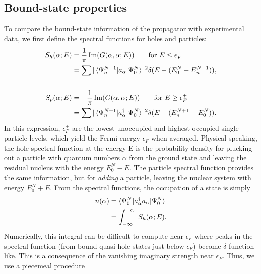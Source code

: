 \subsection{Bound-state properties}
To compare the bound-state information of the propagator with experimental data, we first
define the spectral functions for holes and particles:
\begin{equation}
    \begin{split}
        S_{h}(\alpha; E) & =
        \frac{1}{\pi}\operatorname{Im}({G(\alpha,\alpha;E)})\qquad \text{for } E\leq\epsilon_{F}^{-}\\
        & = \sum|\braket{\Psi^{N-1}_{n}|a_{\alpha}|\Psi^{N}_{0}}|^{2}
        \delta(E-(E^{N}_{0}-E_{n}^{N-1})),\\
        \\
        S_{p}(\alpha; E) & =
        -\frac{1}{\pi}\operatorname{Im}({G(\alpha,\alpha;E)})\qquad \text{for } E\geq\epsilon_{F}^{+}\\
        & = \sum|\braket{\Psi^{N+1}_{n}|a_{\alpha}^{\dagger}|\Psi^{N}_{0}}|^{2}
        \delta(E-(E_{n}^{N+1}-E^{N}_{0})).
    \end{split}
\end{equation}
In this expression, $\epsilon_{F}^{\pm}$ are the lowest-unoccupied and highest-occupied
single-particle levels, which yield the Fermi energy $\epsilon_{F}$ when averaged. Physical
speaking, the hole spectral function at the energy E is the probability density for plucking out
a particle with quantum numbers $\alpha$ from the ground state and leaving the residual nucleus with the
energy $E^{N}_{0}-E$. The particle spectral function provides the same
information, but for \textit{adding} a
particle, leaving the nuclear system with energy $E^{N}_{0}+E$. From the spectral functions, the occupation of a state is simply
\begin{equation} \label{ParticleNumber}
    \begin{split}
        n(\alpha) & = \braket{\Psi^{N}_{0}|a_{\alpha}^{\dagger}a_{\alpha}|\Psi^{N}_{0}}\\
        & = \int_{-\infty}^{-\epsilon_{F}}S_{h}(\alpha; E).
    \end{split}
\end{equation}
Numerically, this integral can be difficult to compute near $\epsilon_{F}$ where peaks in the
spectral function (from bound quasi-hole states just below $\epsilon_{F}$) become $\delta$-function-like. 
This is a consequence of the vanishing imaginary strength near $\epsilon_{F}$. Thus, we use a piecemeal procedure
